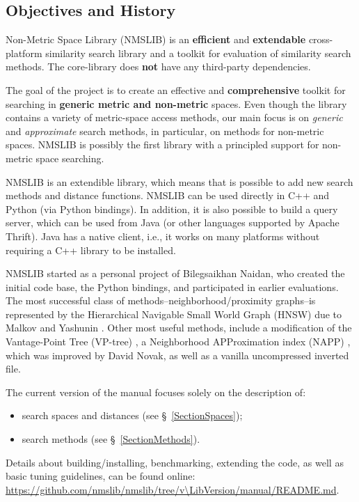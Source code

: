 \subsection{Objectives and History}

Non-Metric Space Library (NMSLIB) is an \textbf{efficient} and \textbf{extendable} cross-platform similarity search library and a toolkit for evaluation of similarity search methods.  The core-library does \textbf{not} have any third-party dependencies.

The goal of the project is to create an effective and \textbf{comprehensive} toolkit for searching in \textbf{generic metric and non-metric} spaces.
Even though the library contains a variety of metric-space access methods,
our main focus is on \emph{generic} and \emph{approximate} search methods,
in particular, on methods for non-metric spaces.
NMSLIB is possibly the first library with a principled support for non-metric space searching.

NMSLIB is an extendible library, which means that is possible to add new search methods and distance functions. NMSLIB can be used directly in C++ and Python (via Python bindings). In addition, it is also possible to build a query server, which can be used from Java (or other languages supported by Apache Thrift). Java has a native client, i.e., it works on many platforms without requiring a C++ library to be installed.

NMSLIB started as a personal project of Bilegsaikhan Naidan, who created the initial code base, the Python bindings,
and participated in earlier evaluations. 
The most successful class of methods--neighborhood/proximity graphs--is represented by the Hierarchical Navigable Small World Graph (HNSW)
due to Malkov and Yashunin \cite{Malkov2016}. 
Other most useful methods, include a modification of the Vantage-Point Tree (VP-tree) \cite{Boytsov_and_Bilegsaikhan:nips2013},
a Neighborhood APProximation index (NAPP) \cite{tellez2013succinct},
which was improved by David Novak,
as well as a vanilla uncompressed inverted file.

The current version of the manual focuses solely on the description of:
\begin{itemize}
    \item search spaces and distances (see \S~\ref{SectionSpaces});
    \item search methods (see \S~\ref{SectionMethods}).
\end{itemize}

Details about building/installing, benchmarking, extending the code, as well as basic
tuning guidelines, can be found online: \url{https://github.com/nmslib/nmslib/tree/v\LibVersion/manual/README.md}.

